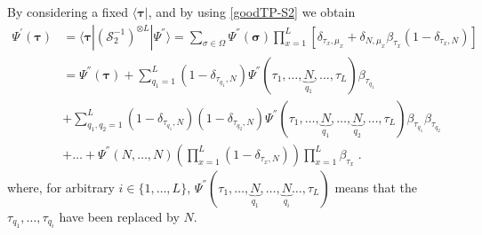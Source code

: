 \documentclass[10pt]{article}
\numberwithin{equation}{section}
\numberwithin{equation}{subsection}
\newcommand{\dt}{\;.}
\begin{document}
 By considering a fixed $\langle\bm{\tau}|$, and by using \eqref{goodTP-S2} we obtain 
\begin{equation}\label{ABS_intermediate}
	\begin{split}
		\Psi^{'}(\bm{\tau})&=\langle \bm{\tau}|(\mathcal{S}_{2}^{-1})^{\otimes L}|\Psi^{''}\rangle=\sum_{\sigma\in \Omega}\Psi^{''}(\bm{\sigma})\prod_{x=1}^L\left[ \delta_{\tau_x,\mu_x}+\delta_{N,\mu_x}\beta_{\tau_x} (1-\delta_{\tau_x,N})\right]\\&= \Psi^{''}(\bm{\tau})+\sum_{q_{1}= 1}^{L}(1-\delta_{\tau_{q_{1}},N})\Psi^{''}(\tau_{1},\ldots,\underbrace{N}_{q_{1}},\ldots,\tau_{L})\beta_{\tau_{q_{1}}}\\&+
		\sum_{q_{1},q_{2}= 1}^{L}(1-\delta_{\tau_{q_{1}},N})(1-\delta_{\tau_{q_{2}},N})\Psi^{''}(\tau_{1},\ldots,\underbrace{N}_{q_{1}},\ldots,\underbrace{N}_{q_{2}},\ldots,\tau_{L})\beta_{\tau_{q_{1}}}\beta_{\tau_{q_{2}}}\\&+\ldots+\Psi^{''}(N,\ldots,N)\left(\prod_{x=1}^{L}(1-\delta_{\tau_{x},N})\right)\prod_{x=1}^{L}\beta_{\tau_{x}}\dt%
	\end{split}
\end{equation}
where, for arbitrary $i\in\{1,\ldots,L\}$,  $\Psi^{''}(\tau_{1},\ldots,\underbrace{N}_{q_{1}},\ldots,\underbrace{N}_{q_{i}}\ldots,\tau_{L})$ means that the $\tau_{q_{1}},\ldots,\tau_{q_{i}}$ have been replaced by $N$. \\
\end{document}
